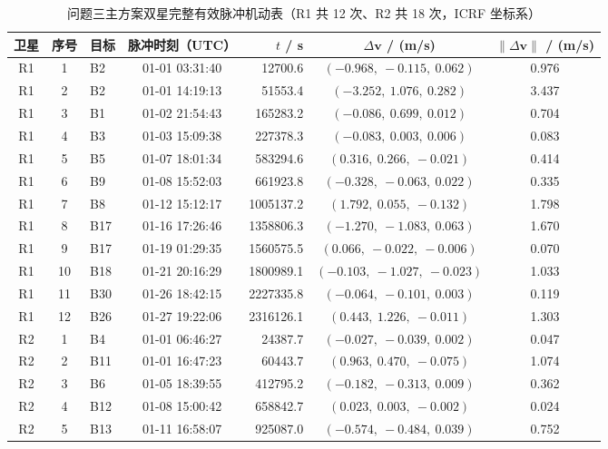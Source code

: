 \clearpage
\begin{table}[!htb]
  \centering
  \caption{问题三主方案双星完整有效脉冲机动表（R1 共 12 次、R2 共 18 次，ICRF 坐标系）}
  \label{tab:app_q3burns}
  \setlength{\tabcolsep}{3.2pt}\renewcommand{\arraystretch}{1.08}
  \begin{tabular}{cclcrcc}
    \toprule
    卫星 & 序号 & 目标 & 脉冲时刻（UTC） & $t$ / s & $\Delta\bm v$ / (m/s) & $\|\Delta\bm v\|$ / (m/s) \\
    \midrule
    R1 & 1 & B2 & 01-01 03:31:40 & 12700.6 & $(-0.968,\ -0.115,\ 0.062)$ & 0.976 \\
    R1 & 2 & B2 & 01-01 14:19:13 & 51553.4 & $(-3.252,\ 1.076,\ 0.282)$ & 3.437 \\
    R1 & 3 & B1 & 01-02 21:54:43 & 165283.2 & $(-0.086,\ 0.699,\ 0.012)$ & 0.704 \\
    R1 & 4 & B3 & 01-03 15:09:38 & 227378.3 & $(-0.083,\ 0.003,\ 0.006)$ & 0.083 \\
    R1 & 5 & B5 & 01-07 18:01:34 & 583294.6 & $(0.316,\ 0.266,\ -0.021)$ & 0.414 \\
    R1 & 6 & B9 & 01-08 15:52:03 & 661923.8 & $(-0.328,\ -0.063,\ 0.022)$ & 0.335 \\
    R1 & 7 & B8 & 01-12 15:12:17 & 1005137.2 & $(1.792,\ 0.055,\ -0.132)$ & 1.798 \\
    R1 & 8 & B17 & 01-16 17:26:46 & 1358806.3 & $(-1.270,\ -1.083,\ 0.063)$ & 1.670 \\
    R1 & 9 & B17 & 01-19 01:29:35 & 1560575.5 & $(0.066,\ -0.022,\ -0.006)$ & 0.070 \\
    R1 & 10 & B18 & 01-21 20:16:29 & 1800989.1 & $(-0.103,\ -1.027,\ -0.023)$ & 1.033 \\
    R1 & 11 & B30 & 01-26 18:42:15 & 2227335.8 & $(-0.064,\ -0.101,\ 0.003)$ & 0.119 \\
    R1 & 12 & B26 & 01-27 19:22:06 & 2316126.1 & $(0.443,\ 1.226,\ -0.011)$ & 1.303 \\
    \midrule
    R2 & 1 & B4 & 01-01 06:46:27 & 24387.7 & $(-0.027,\ -0.039,\ 0.002)$ & 0.047 \\
    R2 & 2 & B11 & 01-01 16:47:23 & 60443.7 & $(0.963,\ 0.470,\ -0.075)$ & 1.074 \\
    R2 & 3 & B6 & 01-05 18:39:55 & 412795.2 & $(-0.182,\ -0.313,\ 0.009)$ & 0.362 \\
    R2 & 4 & B12 & 01-08 15:00:42 & 658842.7 & $(0.023,\ 0.003,\ -0.002)$ & 0.024 \\
    R2 & 5 & B13 & 01-11 16:58:07 & 925087.0 & $(-0.574,\ -0.484,\ 0.039)$ & 0.752 \\

\end{tabular}
\end{table}
